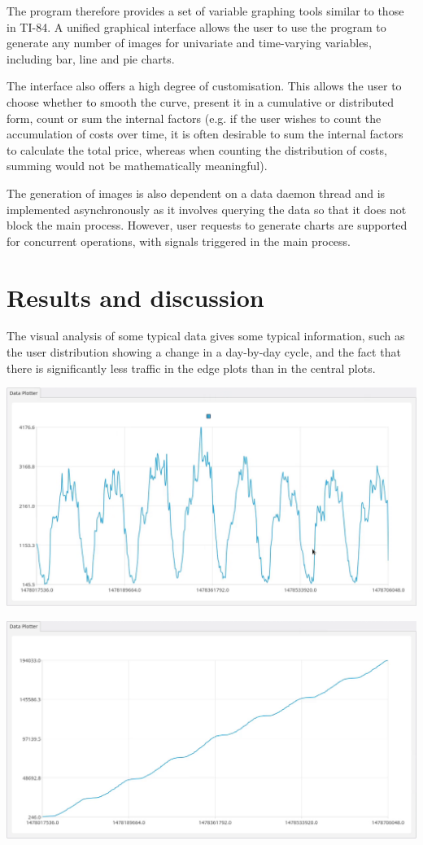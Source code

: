 \documentclass[
]{article}
\begin{document}
The program therefore provides a set of variable graphing tools similar
to those in TI-84. A unified graphical interface allows the user to use
the program to generate any number of images for univariate and
time-varying variables, including bar, line and pie charts.

The interface also offers a high degree of customisation. This allows
the user to choose whether to smooth the curve, present it in a
cumulative or distributed form, count or sum the internal factors (e.g.
if the user wishes to count the accumulation of costs over time, it is
often desirable to sum the internal factors to calculate the total
price, whereas when counting the distribution of costs, summing would
not be mathematically meaningful).

The generation of images is also dependent on a data daemon thread and
is implemented asynchronously as it involves querying the data so that
it does not block the main process. However, user requests to generate
charts are supported for concurrent operations, with signals triggered
in the main process.

\section{Results and discussion}

The visual analysis of some typical data gives some typical information,
such as the user distribution showing a change in a day-by-day cycle,
and the fact that there is significantly less traffic in the edge plots
than in the central plots.

\begin{center}
\includegraphics[width=0.7\linewidth]{./p1.png}

\includegraphics[width=0.7\linewidth]{./p2.png}
\end{center}
\end{document}
